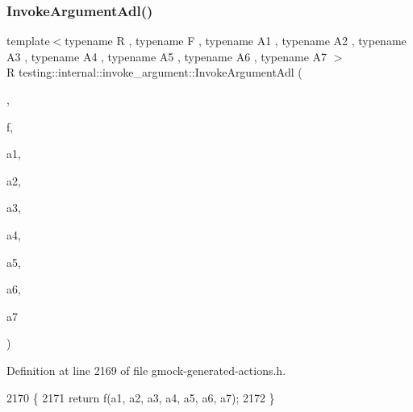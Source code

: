 \subsubsection{\texorpdfstring{Invoke\+Argument\+Adl()}{InvokeArgumentAdl()}\hspace{0.1cm}{\footnotesize\ttfamily [8/11]}}
{\footnotesize\ttfamily template$<$typename R , typename F , typename A1 , typename A2 , typename A3 , typename A4 , typename A5 , typename A6 , typename A7 $>$ \\
R testing\+::internal\+::invoke\+\_\+argument\+::\+Invoke\+Argument\+Adl (\begin{DoxyParamCaption}\item[{\hyperlink{structtesting_1_1internal_1_1invoke__argument_1_1AdlTag}{Adl\+Tag}}]{,  }\item[{F}]{f,  }\item[{A1}]{a1,  }\item[{A2}]{a2,  }\item[{A3}]{a3,  }\item[{A4}]{a4,  }\item[{A5}]{a5,  }\item[{A6}]{a6,  }\item[{A7}]{a7 }\end{DoxyParamCaption})}



Definition at line 2169 of file gmock-\/generated-\/actions.\+h.


\begin{DoxyCode}
2170            \{
2171   \textcolor{keywordflow}{return} f(a1, a2, a3, a4, a5, a6, a7);
2172 \}
\end{DoxyCode}
\mbox{\label{namespacetesting_1_1internal_1_1invoke__argument_a43c35b90896110940a0cc41c337ca306}} 
